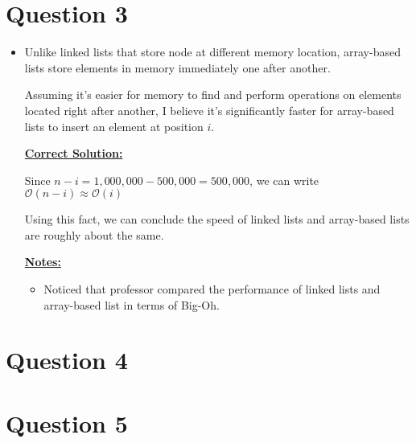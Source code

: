 \documentclass[12pt]{article}
\begin{document}
\section*{Question 3}
\begin{itemize}
    \item

    Unlike linked lists that store node at different memory location, array-based
    lists store elements in memory immediately one after another.

    \bigskip

    Assuming it's easier for memory to find and perform operations on elements
    located right after another, I believe it's significantly faster for
    array-based lists to insert an element at position $i$.

    \bigskip

    \begin{mdframed}
        \underline{\textbf{Correct Solution:}}

        \bigskip

        \color{red}
        Since $n - i = 1,000,000 - 500,000 = 500,000$, we can write
        $\mathcal{O}(n-i) \approx \mathcal{O}(i)$

        \bigskip

        Using this fact, we can conclude the speed of linked lists and array-based
        lists are roughly about the same.
        \color{black}
    \end{mdframed}

    \bigskip

    \underline{\textbf{Notes:}}

    \bigskip

    \begin{itemize}
        \item Noticed that professor compared the performance of linked lists
        and array-based list in terms of Big-Oh.
    \end{itemize}

\end{itemize}

\section*{Question 4}

\section*{Question 5}
\end{document}
